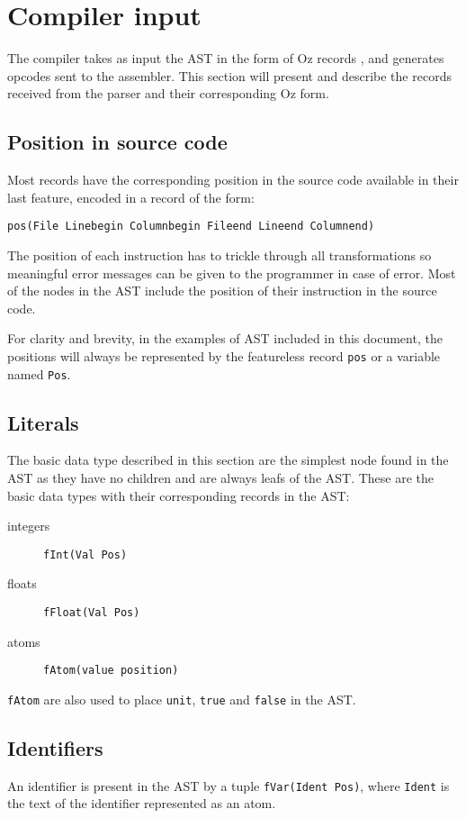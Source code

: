 \documentclass[a4paper]{memoir}
\begin{document}
\section{Compiler input}\label{section:compilerinput}
The compiler takes as input the AST in the form of Oz records \cite{AST}, and generates opcodes sent to the assembler. 
This section will present and describe the records received from the parser and
their corresponding Oz form.
\subsection{Position in source code}
Most records have the corresponding position in the source code available in
their last feature, encoded in a record of the form:
\begin{lstlisting}
pos(File Linebegin Columnbegin Fileend Lineend Columnend)
\end{lstlisting}
The position of each instruction has to trickle through all transformations so meaningful error messages can be given to the programmer in case of error.
Most of the nodes in the AST include the position of their instruction in the
source code.

For clarity and brevity, in the examples of AST included in this document, the
positions will always be represented by the featureless record \lstinline!pos!
or a variable named \lstinline!Pos!. 
\subsection{Literals}
The basic data type described in this section are the simplest node found in the AST as they have no children and are always leafs of the AST.
These are the basic data types with their corresponding records in the AST:
\begin{description}
  \item[integers] \lstinline!fInt(Val Pos)!
  \item[floats] \lstinline!fFloat(Val Pos)!
  \item[atoms] \lstinline!fAtom(value position)!
\end{description}

\lstinline!fAtom! are also used to place \lstinline!unit!, \lstinline!true! and
\lstinline!false! in the AST.

\subsection{Identifiers}\label{sec:input:identifiers}
An identifier is present in the AST by a tuple \lstinline!fVar(Ident Pos)!,
where \lstinline!Ident! is the text of the identifier represented as an atom.
\end{document}
